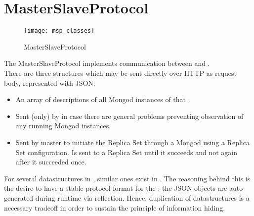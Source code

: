 \section{MasterSlaveProtocol}

\begin{figure}[H]
	\texttt{[image: msp\_classes]}
	\caption{MasterSlaveProtocol}
\end{figure}

The MasterSlaveProtocol  implements communication between  and .\\
There are three structures which may be sent directly over HTTP as request body, represented with JSON:
\begin{itemize}
  \item {} An array of descriptions of all Mongod instances of that .
  \item {} Sent (only) by  in case there are general problems preventing observation of any running Mongod instances.
  \item {} Sent by master to initiate the Replica Set through a Mongod using a Replica Set configuration. Is sent to a Replica Set until it succeeds and not again after it succeeded once.
\end{itemize}

For several datastructures in , similar ones exist in  . The reasoning behind this is the desire to have a
stable protocol format for the : the JSON objects are auto-generated during runtime via reflection.
Hence, duplication of datastructures is a necessary tradeoff in order to sustain the principle of information hiding.


